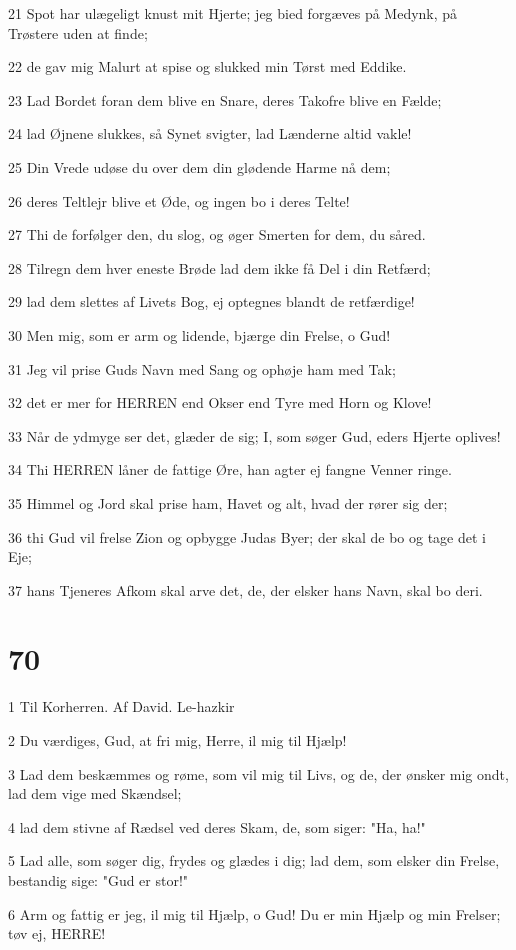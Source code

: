 \par 21 Spot har ulægeligt knust mit Hjerte; jeg bied forgæves på Medynk, på Trøstere uden at finde;
\par 22 de gav mig Malurt at spise og slukked min Tørst med Eddike.
\par 23 Lad Bordet foran dem blive en Snare, deres Takofre blive en Fælde;
\par 24 lad Øjnene slukkes, så Synet svigter, lad Lænderne altid vakle!
\par 25 Din Vrede udøse du over dem din glødende Harme nå dem;
\par 26 deres Teltlejr blive et Øde, og ingen bo i deres Telte!
\par 27 Thi de forfølger den, du slog, og øger Smerten for dem, du såred.
\par 28 Tilregn dem hver eneste Brøde lad dem ikke få Del i din Retfærd;
\par 29 lad dem slettes af Livets Bog, ej optegnes blandt de retfærdige!
\par 30 Men mig, som er arm og lidende, bjærge din Frelse, o Gud!
\par 31 Jeg vil prise Guds Navn med Sang og ophøje ham med Tak;
\par 32 det er mer for HERREN end Okser end Tyre med Horn og Klove!
\par 33 Når de ydmyge ser det, glæder de sig; I, som søger Gud, eders Hjerte oplives!
\par 34 Thi HERREN låner de fattige Øre, han agter ej fangne Venner ringe.
\par 35 Himmel og Jord skal prise ham, Havet og alt, hvad der rører sig der;
\par 36 thi Gud vil frelse Zion og opbygge Judas Byer; der skal de bo og tage det i Eje;
\par 37 hans Tjeneres Afkom skal arve det, de, der elsker hans Navn, skal bo deri.

\chapter{70}

\par 1 Til Korherren. Af David. Le-hazkir
\par 2 Du værdiges, Gud, at fri mig, Herre, il mig til Hjælp!
\par 3 Lad dem beskæmmes og røme, som vil mig til Livs, og de, der ønsker mig ondt, lad dem vige med Skændsel;
\par 4 lad dem stivne af Rædsel ved deres Skam, de, som siger: "Ha, ha!"
\par 5 Lad alle, som søger dig, frydes og glædes i dig; lad dem, som elsker din Frelse, bestandig sige: "Gud er stor!"
\par 6 Arm og fattig er jeg, il mig til Hjælp, o Gud! Du er min Hjælp og min Frelser; tøv ej, HERRE!

